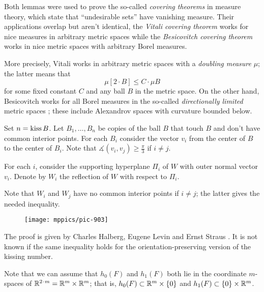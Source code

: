 Both lemmas were used to prove the so-called \emph{covering theorems} in measure theory,
which state that ``undesirable sets'' have vanishing measure.
Their applications overlap but aren't identical, the \emph{Vitali covering theorem} works for nice measures in arbitrary metric spaces while the \emph{Besicovitch covering theorem} works in nice metric spaces with arbitrary Borel measures.

More precisely, Vitali works in arbitrary metric spaces with a \emph{doubling measure} $\mu$;
the latter means that 
\[\mu [2\cdot B]\le C\cdot \mu B\] 
for some fixed constant $C$ and any ball $B$ in the metric space.
On the other hand, Besicovitch works for all Borel measures in the so-called \emph{directionally limited} metric spaces \cite[see 2.8.9 in][]{federer};
these include Alexandrov spaces with curvature bounded below.





Set $n=\mathop{\rm kiss} B$.
Let $B_1,\dots, B_n$ be copies of the ball $B$ that touch $B$ and don't have common interior points.
For each $B_i$ consider the vector $v_i$ from the center of $B$ to the center of $B_i$.
Note that $\measuredangle(v_i,v_j)\ge \tfrac\pi3$ if $i\ne j$.

For each $i$,
consider the supporting hyperplane $\Pi_i$
of $W$
with outer normal vector $v_i$.
Denote by $W_i$ the reflection of $W$ with respect to $\Pi_i$.

Note that $W_i$ and $W_j$ have no common interior points if $i\ne j$;
the latter gives the needed inequality.
\qeds

{

\begin{wrapfigure}{r}{43 mm}
\vskip-0mm
\centering
\texttt{[image: mppics/pic-903]}
\end{wrapfigure}

The proof is given by 
Charles Halberg, 
Eugene Levin 
and Ernst Straus 
\cite{halberg-levin-straus}.
It is not known if the same inequality holds for the orientation-preserving version of the kissing number.


Note that we can assume
that $h_0(F)$ and $h_1(F)$ both lie in the coordinate $m$-spaces of $\RR^{2\cdot m}=\RR^m\times \RR^m$;
that is,
$h_0(F)\z\subset\RR^m\times\{0\}$
and $h_1(F)\subset  \{0\}\times\mathbb{R}^m$.

}


